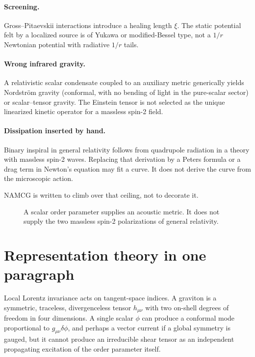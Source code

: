 \paragraph{Screening.}
Gross--Pitaevskii interactions introduce a healing length \(\xi\). The
static potential felt by a localized source is of Yukawa or
modified-Bessel type, not a \(1/r\) Newtonian potential with radiative
\(1/r\) tails.

\paragraph{Wrong infrared gravity.}
A relativistic scalar condensate coupled to an auxiliary metric
generically yields Nordstr\"om gravity (conformal, with no bending of
light in the pure-scalar sector) or scalar--tensor gravity. The Einstein
tensor is not selected as the unique linearized kinetic operator for a
massless spin-2 field.

\paragraph{Dissipation inserted by hand.}
Binary inspiral in general relativity follows from quadrupole radiation
in a theory with massless spin-2 waves. Replacing that derivation by a
Peters formula or a drag term in Newton's equation may fit a curve. It
does not derive the curve from the microscopic action.

NAMCG is written to climb over that ceiling, not to decorate it.

\begin{figure}[ht]
  \centering
  
  \caption{A scalar order parameter supplies an acoustic metric.
    It does not supply the two massless spin-2 polarizations of
    general relativity.}
  \label{fig:scalar-vs-gr}
\end{figure}

\section{Representation theory in one paragraph}
\label{sec:ch1-reps}

Local Lorentz invariance acts on tangent-space indices. A graviton is a
symmetric, traceless, divergenceless tensor \(h_{\mu\nu}\) with two
on-shell degrees of freedom in four dimensions. A single scalar
\(\phi\) can produce a conformal mode proportional to
\(g_{\mu\nu}\delta\phi\), and perhaps a vector current if a global
symmetry is gauged, but it cannot produce an irreducible shear tensor
as an independent propagating excitation of the order parameter itself.

